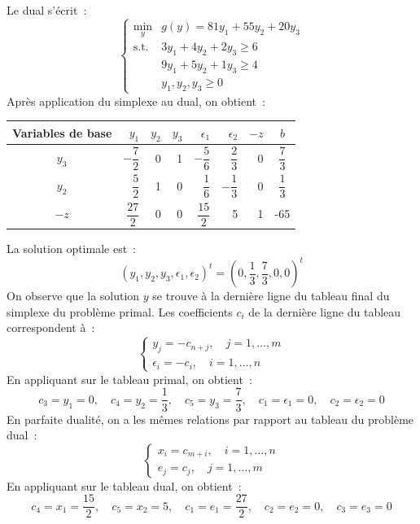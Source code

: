 \documentclass[a4paper,12pt,openany]{book}
\theoremstyle{plain}
\theoremstyle{definition}
\theoremstyle{remark}
\theoremstyle{nbstyle}
\begin{document}
	Le dual s'écrit~:
	\[
	\left\{
	\begin{array}{ll}
	\displaystyle\min_{y} & g(y) = 81 y_{1} + 55 y_{2} + 20 y_{3} \\
	\text{s.t.} & 3 y_{1} + 4 y_{2} + 2 y_{3} \geq 6 \\
	& 9 y_{1} + 5 y_{2} + 1 y_{3} \geq 4 \\
	& y_{1}, y_{2}, y_{3} \geq 0
	\end{array}
	\right.
	\]
	Après application du simplexe au dual, on obtient~:
	\begin{center}
		\begin{tabular}{|c|rrrrrr|c|}
			\toprule
			Variables de base & $y_{1}$ & $y_{2}$ & $y_{3}$ & $\epsilon_{1}$ & $\epsilon_{2}$ & $-z$ & $b$ \\
			\midrule
			$y_{3}$ & $-\dfrac{7}{2}$ & 0 & 1 & $-\dfrac{5}{6}$ & $\dfrac{2}{3}$ & 0 & $\dfrac{7}{3}$ \\
			
			$y_{2}$ & $\dfrac{5}{2}$ & 1 & 0 & $\dfrac{1}{6}$ & $-\dfrac{1}{3}$ & 0 & $\dfrac{1}{3}$ \\
			\midrule
			$-z$ & $\dfrac{27}{2}$ & 0 & 0 & $\dfrac{15}{2}$ & 5 & 1 & -65 \\
			\bottomrule
		\end{tabular}
	\end{center}
	La solution optimale est~:
	\[
	(y_{1}, y_{2}, y_{3}, \epsilon_{1}, \epsilon_{2})^{t} = \left(0, \dfrac{1}{3}, \dfrac{7}{3}, 0, 0\right)^{t}
	\]
	On observe que la solution $y$ se trouve à la dernière ligne du tableau final du simplexe du problème primal. Les coefficients $c_{i}$ de la dernière ligne du tableau correspondent à~:
	\[
	\left\{
	\begin{array}{l}
	y_{j} = -c_{n+j}, \quad j = 1, \ldots, m \\
	\epsilon_{i} = -c_{i}, \quad i = 1, \ldots, n
	\end{array}
	\right.
	\]
	En appliquant sur le tableau primal, on obtient~:
	\[
	c_{3} = y_{1} = 0, \quad c_{4} = y_{2} = \dfrac{1}{3}, \quad c_{5} = y_{3} = \dfrac{7}{3}, \quad c_{1} = \epsilon_{1} = 0, \quad c_{2} = \epsilon_{2} = 0
	\]
	En parfaite dualité, on a les mêmes relations par rapport au tableau du problème dual~:
	\[
	\left\{
	\begin{array}{l}
	x_{i} = c_{m+i}, \quad i = 1, \ldots, n \\
	e_{j} = c_{j}, \quad j = 1, \ldots, m
	\end{array}
	\right.
	\]
	En appliquant sur le tableau dual, on obtient~:
	\[
	c_{4} = x_{1} = \dfrac{15}{2}, \quad c_{5} = x_{2} = 5, \quad c_{1} = e_{1} = \dfrac{27}{2}, \quad c_{2} = e_{2} = 0, \quad c_{3} = e_{3} = 0
	\]
\end{document}
